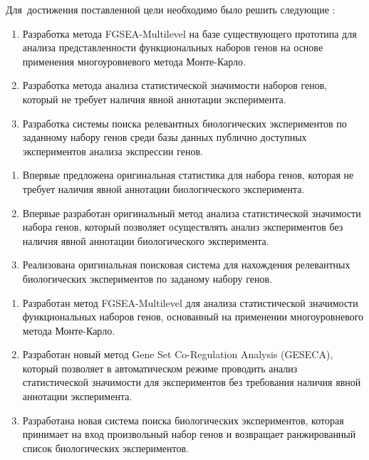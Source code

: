 Для~достижения поставленной цели необходимо было решить следующие {\tasks}:
\begin{enumerate}[beginpenalty=10000] %
  \item Разработка метода FGSEA-Multilevel на базе существующего прототипа для анализа представленности функциональных наборов генов на основе применения многоуровневого метода Монте-Карло.
  \item Разработка метода анализа статистической значимости наборов генов, который не требует наличия явной аннотации эксперимента. 
  \item Разработка системы поиска релевантных биологических экспериментов по заданному набору генов среди базы данных публично доступных экспериментов анализа экспрессии генов.
\end{enumerate}


{\novelty}
\begin{enumerate}[beginpenalty=10000] %
  \item Впервые предложена оригинальная статистика для набора генов, которая не требует наличия явной аннотации биологического эксперимента.
  \item Впервые разработан оригинальный метод анализа статистической значимости  набора генов, который позволяет осуществлять анализ экспериментов без наличия явной аннотации биологического эксперимента.
  \item Реализована оригинальная поисковая система для нахождения релевантных биологических экспериментов по заданому набору генов.
\end{enumerate}

{}
\begin{enumerate}[beginpenalty=10000] %
  \item Разработан метод FGSEA-Multilevel для анализа статистической значимости функциональных наборов генов, основанный на применении многоуровневого метода Монте-Карло.
  \item Разработан новый метод Gene Set Co-Regulation Analysis (GESECA), который позволяет в автоматическом режиме проводить анализ статистической значимости для экспериментов без требования наличия явной аннотации эксперимента.
  \item Разработана новая система поиска биологических экспериментов, которая принимает на вход произвольный набор генов и возвращает ранжированный список биологических экспериментов.
\end{enumerate}



